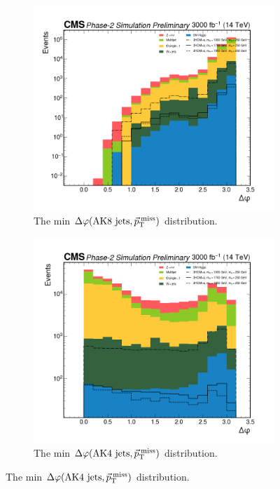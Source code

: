 \begin{figure}[ht]
    \centering
    
    \begin{subfigure}[b]{0.45\textwidth}
        \centering
        \includegraphics[width=\textwidth]{Chapters/Strategy/selections/dphi_AK8_MET.png}
        \caption{The min $\Delta\varphi(\text{AK8 jets},\vec{p}_\mathrm{T}^{\kern2pt\text{miss}})$ distribution.}
        \label{fig:dphiak8met}
    \end{subfigure}
    \hfill
    \begin{subfigure}[b]{0.45\textwidth}
        \centering
         \includegraphics[width=\textwidth]{Chapters/Strategy/selections/dphi_AK4_MET.png}
        \caption{The min $\Delta\varphi(\text{AK4 jets},\vec{p}_\mathrm{T}^{\kern2pt\text{miss}})$ distribution.}
        \label{fig:dphiak4met}
    \end{subfigure}
    

\end{figure}
